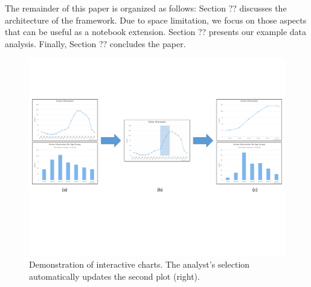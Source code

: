 The remainder of this paper is organized as follows: Section ?? discusses the architecture of the {\projname} framework. Due to space limitation, we focus on those aspects that can be useful as a notebook extension. Section ?? presents our example data analysis. Finally, Section ?? concludes the paper.

\begin{figure}
	\includegraphics[width=\textwidth]{figures/highchart_final_a.pdf}
	\caption{Demonstration of interactive charts. The analyst's selection automatically updates the second plot (right).}
	\label{fig:vision}
\end{figure}

